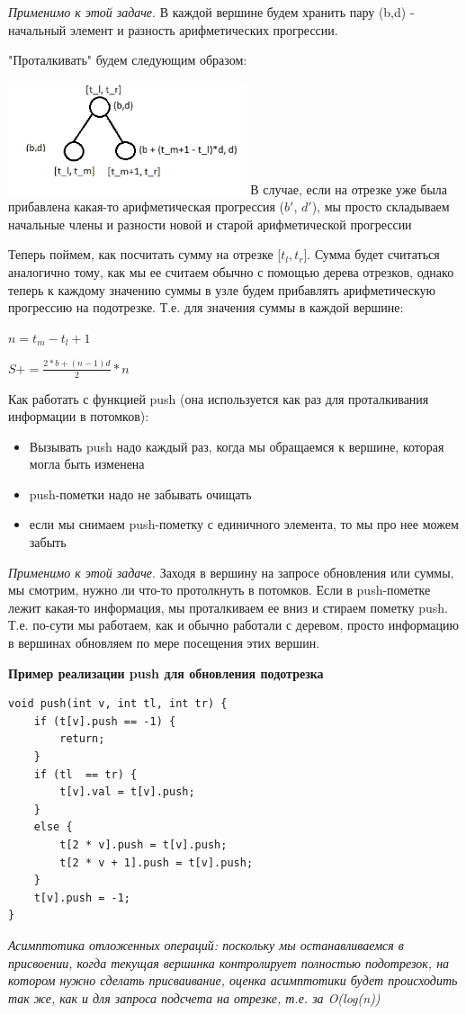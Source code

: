 \textit{Применимо к этой задаче}. В каждой вершине будем хранить пару (b,d) - начальный элемент и разность арифметических прогрессии.

"Проталкивать"  будем следующим образом:

\includegraphics[width=7cm]{images/60-62_fractional1}
В случае, если на отрезке уже была прибавлена какая-то арифметическая прогрессия ($b'$, $d'$), мы просто складываем начальные члены и разности новой и старой арифметической прогрессии

Теперь поймем, как посчитать сумму на отрезке [$t_l, t_r$]. Сумма будет считаться аналогично тому, как мы ее считаем обычно с помощью дерева отрезков, однако теперь к каждому значению суммы в узле будем прибавлять арифметическую прогрессию на подотрезке. Т.е. для значения суммы в каждой вершине:

$n = t_m - t_l + 1$

$S += \frac{2*b + (n-1)d}{2}*n$

Как работать с функцией push (она используется как раз для проталкивания информации в потомков):

\begin{itemize}
    \item Вызывать push надо каждый раз, когда мы обращаемся к вершине, которая могла быть изменена
    \item push-пометки надо не забывать очищать
    \item если мы снимаем push-пометку с единичного элемента, то мы про нее можем забыть
\end{itemize}

\textit{Применимо к этой задаче}. Заходя в вершину на запросе обновления или суммы, мы смотрим, нужно ли что-то протолкнуть в потомков. Если в push-пометке лежит какая-то информация, мы проталкиваем ее вниз и стираем пометку push. Т.е. по-сути мы работаем, как и обычно работали с деревом, просто информацию в вершинах обновляем по мере посещения этих вершин.

\textbf{Пример реализации push для обновления подотрезка}

\begin{lstlisting}
void push(int v, int tl, int tr) {
	if (t[v].push == -1) {
		return;
	}
	if (tl  == tr) {
		t[v].val = t[v].push;
	}
	else {
		t[2 * v].push = t[v].push;
		t[2 * v + 1].push = t[v].push;
	}
	t[v].push = -1;
}
\end{lstlisting}
\textit{Асимптотика отложенных операций: поскольку мы останавливаемся в присвоении, когда текущая вершинка контролирует полностью подотрезок, на котором нужно сделать присваивание, оценка асимптотики будет происходить так же, как и для запроса подсчета на отрезке, т.е. за O(log(n))}